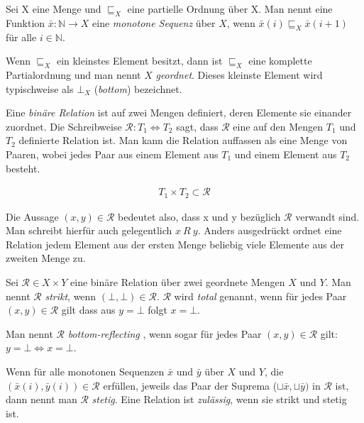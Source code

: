 Sei X eine Menge und $\sqsubseteq_{X}$ eine partielle Ordnung über X. Man nennt eine Funktion $\bar{x} : \mathbb{N} \rightarrow X$
eine \textit{monotone Sequenz} über $X$, wenn $\bar{x}(i) \sqsubseteq_{X} \bar{x}(i + 1)$ für alle $i \in \mathbb{N}$.

Wenn $\sqsubseteq_{X}$ ein kleinstes Element besitzt, dann ist $\sqsubseteq_{X}$ eine komplette Partialordnung und man nennt $X$
\textit{geordnet}. Dieses kleinste Element wird typischweise als $\bot_{X}$ (\textit{bottom}) bezeichnet.


Eine \textit{binäre Relation} ist auf zwei Mengen definiert, deren Elemente sie einander zuordnet. Die Schreibweise
$\mathcal{R} : T_1 \Leftrightarrow T_2$ sagt, dass $\mathcal{R}$ eine auf den Mengen $T_1$ und $T_2$ definierte
Relation ist. Man kann die Relation auffassen als eine Menge von Paaren, wobei jedes Paar aus einem Element aus $T_1$ und einem
Element aus $T_2$ besteht.

\begin{align*}
T_1 \times T_2 \subset \mathcal{R}
\end{align*}

Die Aussage $(x, y) \in \mathcal{R}$ bedeutet also, dass x und y bezüglich $\mathcal{R}$ verwandt sind. Man schreibt hierfür
auch gelegentlich $x\ R\ y$. Anders ausgedrückt ordnet eine Relation jedem Element aus der ersten Menge beliebig viele Elemente
aus der zweiten Menge zu.


Sei $\mathcal{R} \in X \times Y$ eine binäre Relation über zwei geordnete Mengen $X$ und $Y$. Man nennt $\mathcal{R}$ \textit{strikt},
wenn $(\bot, \bot) \in \mathcal{R}$. $\mathcal{R}$ wird \textit{total} genannt, wenn für jedes Paar $(x, y) \in \mathcal{R}$ gilt dass
aus $y = \bot$ folgt $x = \bot$.

Man nennt $\mathcal{R}$ \textit{bottom-reflecting} , wenn sogar für jedes Paar
$(x, y) \in \mathcal{R}$ gilt: $y = \bot \Leftrightarrow x = \bot$.

Wenn für alle monotonen Sequenzen $\bar{x}$ und $\bar{y}$ über $X$ und $Y$, die $(\bar{x}(i), \bar{y}(i)) \in \mathcal{R}$
erfüllen, jeweils das Paar der Suprema ($\sqcup{\bar{x}}, \sqcup{\bar{y}})$  in $\mathcal{R}$ ist, dann nennt man $\mathcal{R}$ \textit{stetig}. Eine Relation ist \textit{zulässig}, wenn sie strikt und stetig ist.

